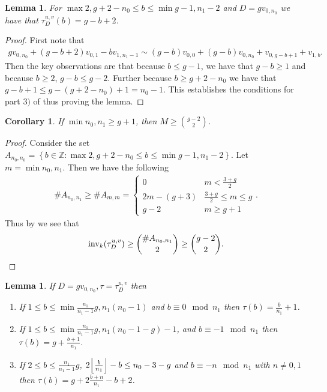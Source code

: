 \documentclass[11pt]{article}
\newtheorem{lemma}[theo]{Lemma}
\newtheorem{coro}[theo]{Corollary}
\theoremstyle{definition}
\numberwithin{equation}{section}
\newcommand{\Z}{\mathbb{Z}}
\newcommand{\inv}{\operatorname{inv}}
\newcommand{\set}[1]{\left\{{#1}\right\}}
\DeclarePairedDelimiter\floor{\lfloor}{\rfloor}
\newcommand{\tauD}{\tau^{u,v}_D}
\begin{document}
\begin{lemma}\label{lem-topOffBottomOffSimple}
    For $\max{2,g+2-n_0}\leq b \leq \min{g-1,n_1-2}$ and $D = gv_{0,n_0}$ we have that $\tauD(b) = g-b+2$.
\end{lemma}

\begin{proof}
    First note that
    \begin{align*}
        gv_{0,n_0}+(g-b+2)v_{0,1}-bv_{1,n_1-1} \sim (g-b)v_{0,0}+(g-b)v_{0,n_0}+v_{0,g-b+1}+v_{1,b}.
    \end{align*}
    Then the key observations are that because $b \leq g-1$, we have that $g-b \geq 1$ and because $b \geq 2$, $g-b \leq g-2$. Further because $b\geq g+2-n_0$ we have that $g-b +1\leq g-(g+2-n_0) + 1 = n_0-1$. This establishes the conditions for part $3)$ of  thus proving the lemma.
\end{proof}

\begin{coro}\label{cor-bothOffMin}
    If $\min{n_0,n_1} \geq g+1$, then $M \geq \binom{g-2}{2}$.
\end{coro}

\begin{proof}
    Consider the set $A_{n_0,n_0} = \set{b \in \Z: \max{2,g+2-n_0}\leq b \leq \min{g-1,n_1-2}}$. Let $m = \min{n_0,n_1}$. Then we have the following
    \begin{align*}
        \#A_{n_0,n_1} \geq \#A_{m,m} = \begin{cases}
            0 & m < \frac{3+g}{2}\\
            2m-(g+3) & \frac{3+g}{2}\leq m \leq g\\
            g-2 & m\geq g+1
        \end{cases}.
    \end{align*}
    Thus by  we see that
\[
        \inv_k(\tauD) \geq \binom{\#A_{n_0,n_1}}{2} \geq \binom{g-2}{2}. \qedhere
\]
\end{proof}

\begin{lemma}\label{lem-topOffBottomOff}
    If $D = gv_{0,n_0}, \tau = \tauD$ then
    \begin{enumerate}[label = \arabic*)]
        \item If $1 \leq b \leq \min{\frac{n_1}{n_1-1}g,n_1(n_0-1)}$ and $b \equiv 0 \mod n_1$ then $\tau(b) = \frac{b}{n_1}+1$.
        \item If $1 \leq b \leq \min{\frac{n_1}{n_1-1}g,n_1(n_0-1-g)-1}$,  and $b \equiv -1 \mod n_1$ then $\tau(b) = g+\frac{b+1}{n_1}$.
        \item If $2 \leq b\leq \frac{n_1}{n_1-1}g$, $2\floor*{\frac{b}{n_1}}-b \leq n_0-3-g$ and $b \equiv -n \mod n_1$ with $n \neq 0,1$ then $\tau(b) = g+2\frac{b+n}{n_1}-b+2$.
    \end{enumerate}
\end{lemma}
\end{document}
